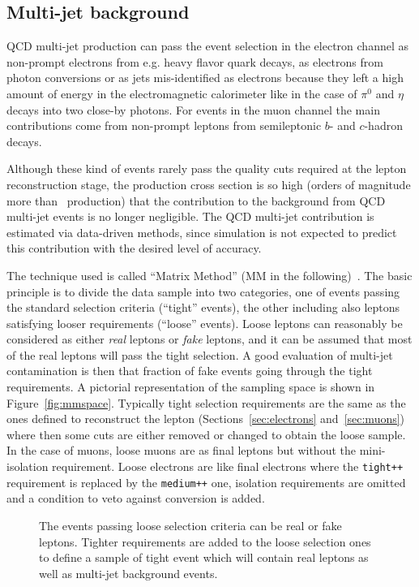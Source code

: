\subsection{Multi-jet background}\label{sec:qcdbkg}

QCD multi-jet production can pass the event selection in the electron
channel as non-prompt electrons from e.g. heavy flavor quark decays, as 
electrons from photon conversions or as jets mis-identified as electrons
because they left a high amount of energy in the electromagnetic calorimeter
like in the case of $\pi^0$ and $\eta$ decays into two close-by photons.
For events in the muon channel the main contributions come from
non-prompt leptons from semileptonic $b$- and $c$-hadron decays.

Although these kind of events rarely pass the quality cuts 
required at the lepton reconstruction stage, the production cross section
is so high (orders  of magnitude more than \ttbar\ production)
that the contribution to the background from QCD multi-jet events is
no longer negligible. The QCD multi-jet contribution
is estimated via data-driven 
methods, since simulation is not expected to predict this contribution
with the desired level of accuracy.

The technique used is called ``Matrix Method'' (MM in the following)~\cite{ttbar_3pb}.  
The basic principle is to divide the data sample into two categories, one
of events passing the standard selection criteria (``tight'' events), the
other including also leptons satisfying looser requirements (``loose'' events).
Loose leptons can reasonably  be considered as either {\it real} leptons or {\it fake} leptons,
and it can be assumed that most of the real leptons will pass the tight selection. 
A good evaluation of multi-jet contamination is then that fraction of fake events going
through the tight requirements. A pictorial representation of the sampling space 
is shown in Figure~\ref{fig:mmspace}. Typically tight selection requirements
are the same as the ones defined to reconstruct the lepton (Sections~\ref{sec:electrons}
and~\ref{sec:muons}) where then some cuts are either removed or changed
to obtain the loose sample. In the case of muons, loose muons are as final 
leptons but without the mini-isolation requirement. Loose electrons are
like final electrons where the \texttt{tight++} requirement is replaced
by the \texttt{medium++} one, isolation requirements are omitted and
a condition to veto against conversion is added.

\begin{figure}[htb]\begin{center}
	\caption{The events passing loose selection criteria can be real or fake leptons.
        Tighter requirements are added to the loose selection ones to define a sample of
        tight event which will contain real leptons as well as multi-jet background events.}
\end{center}\end{figure}

